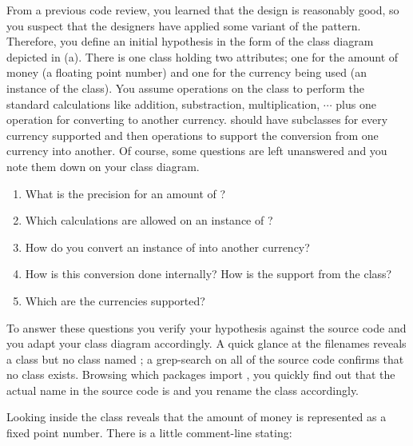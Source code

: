 \documentclass[a4paper,10pt,twoside]{book}
\begin{document}
From a previous code review, you learned that the design is reasonably good, so you suspect 
that the designers have applied some variant of the  pattern. 
Therefore, you define an initial hypothesis in the form of the class diagram depicted in 
 (a). There is one class  holding two attributes; one 
for the amount of money (a floating point number) and one for the currency being used (an 
instance of the  class). You assume operations on the  class to 
perform the standard calculations like addition, substraction, multiplication, $\cdots$ 
plus one operation for converting to another currency.  should have 
subclasses for every currency supported and then operations to support the conversion from 
one currency into another. Of course, some questions are left unanswered and you note them 
down on your class diagram.

\begin{enumerate}
  \item What is the precision for an amount of ?

  \item Which calculations are allowed on an instance of ?

  \item How do you convert an instance of  into another currency?

  \item How is this conversion done internally? How is the support from the  
class?

  \item Which are the currencies supported?

\end{enumerate}

To answer these questions you verify your hypothesis against the source code and you adapt 
your class diagram accordingly. A quick glance at the filenames reveals a class 
 but no class named ; a grep-search on all of the source code 
confirms that no class  exists. Browsing which packages import , 
you quickly find out that the actual name in the source code is  and you rename 
the  class accordingly.

Looking inside the  class reveals that the amount of money is represented as a 
fixed point number. There is a little comment-line stating:

\end{document}
